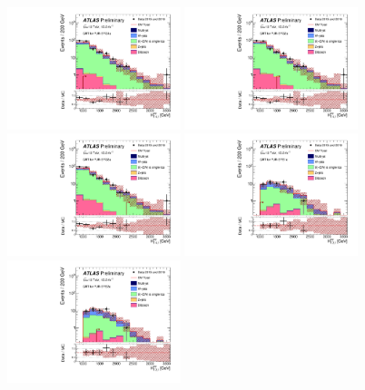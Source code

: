 \begin{figure}[tbp]
\begin{center}
\includegraphics[width=0.45\textwidth]{figures/ATLAS-CONF-2016-078_INT/N-1Plots/AtlasStyle/Preliminary/CRT_SRJigsawSRG1a_LastCut_CRT_minusone}
\includegraphics[width=0.45\textwidth]{figures/ATLAS-CONF-2016-078_INT/N-1Plots/AtlasStyle/Preliminary/CRT_SRJigsawSRG2a_LastCut_CRT_minusone}
\includegraphics[width=0.45\textwidth]{figures/ATLAS-CONF-2016-078_INT/N-1Plots/AtlasStyle/Preliminary/CRT_SRJigsawSRG3a_LastCut_CRT_minusone}
\includegraphics[width=0.45\textwidth]{figures/ATLAS-CONF-2016-078_INT/N-1Plots/AtlasStyle/Preliminary/CRT_SRJigsawSRS1a_LastCut_CRT_minusone}
\includegraphics[width=0.45\textwidth]{figures/ATLAS-CONF-2016-078_INT/N-1Plots/AtlasStyle/Preliminary/CRT_SRJigsawSRS2a_LastCut_CRT_minusone}

\end{center}
\end{figure}
